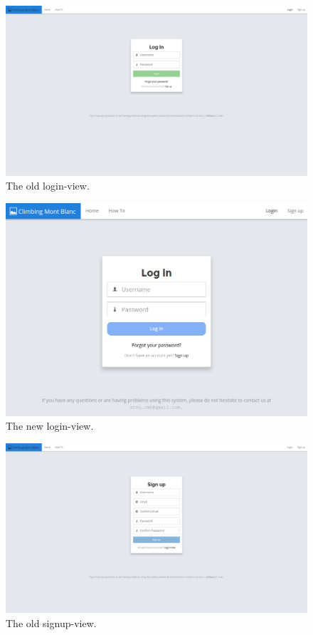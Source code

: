 \begin{figure}[h!]
    \centering
    \includegraphics[width=1.0\textwidth]{oldscreenshots/login.png}
    \caption[]{The old login-view.}
    \label{fig:apdx-old-login}
\end{figure}

\begin{figure}[h!]
    \centering
    \includegraphics[width=1.0\textwidth]{screenshots/login.png}
    \caption[]{The new login-view.}
    \label{fig:apdx-new-login}
\end{figure}

\begin{figure}[h!]
    \centering
    \includegraphics[width=1.0\textwidth]{oldscreenshots/signup.png}
    \caption[]{The old signup-view.}
    \label{fig:apdx-old-signup}
\end{figure}

